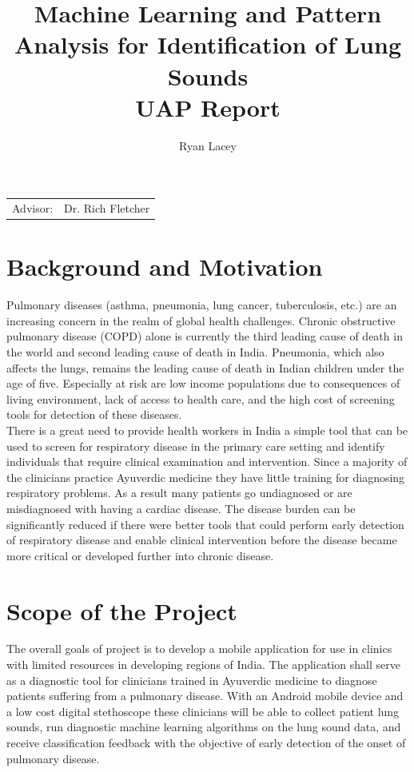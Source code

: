 \documentclass{article}
\title{Machine Learning and Pattern Analysis for Identification of Lung Sounds\\ UAP Report} %
\author{Ryan Lacey}
\date{}
\begin{document}
\maketitle %

\begin{center}
\begin{tabular}{l r}
Advisor: & Dr. Rich Fletcher \\
\end{tabular}
\end{center}

\section{Background and Motivation}

Pulmonary diseases (asthma, pneumonia, lung cancer, tuberculosis, etc.) are an increasing concern in the realm of global health challenges. Chronic obstructive pulmonary disease (COPD) alone is currently the third leading cause of death in the world and second leading cause of death in India. Pneumonia, which also affects the lungs, remains the leading cause of death in Indian children under the age of five. Especially at risk are low income populations due to consequences of living environment, lack of access to health care, and the high cost of screening tools for detection of these diseases.\\

There is a great need to provide health workers in India a simple tool that can be used to screen for respiratory disease in the primary care setting and identify individuals that require clinical examination and intervention. Since a majority of the clinicians practice Ayuverdic medicine they have little training for diagnosing respiratory problems. As a result many patients go undiagnosed or are misdiagnosed with having a cardiac disease. The disease burden can be significantly reduced if there were better tools that could perform early detection of respiratory disease and enable clinical intervention before the disease became more critical or developed further into chronic disease.\\

\section{Scope of the Project}

The overall goals of project is to develop a mobile application for use in clinics with limited resources in developing regions of India. The application shall serve as a diagnostic tool for clinicians trained in Ayuverdic medicine to diagnose patients suffering from a pulmonary disease. With an Android mobile device and a low cost digital stethoscope these clinicians will be able to collect patient lung sounds, run diagnostic machine learning algorithms on the lung sound data, and receive classification feedback with the objective of early detection of the onset of pulmonary disease. \\
\end{document}
